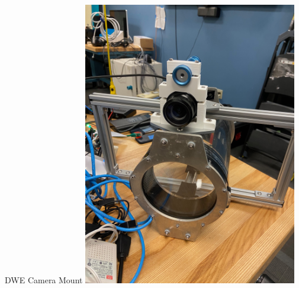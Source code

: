 \begin{frame}{DWE Camera Mount}
    \centering
    \includegraphics[height=0.7\textheight,width=0.7\textwidth,keepaspectratio]{images/dwe_camera_mounted_with_laser.jpeg}
\end{frame}

